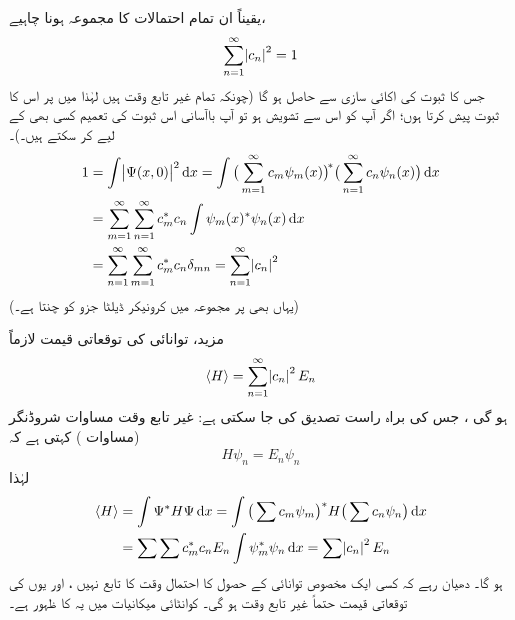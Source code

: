 یقیناً ان تمام احتمالات کا مجموعہ  ہونا  چاہیے،
\begin{align}
\sum_{n=1}^{\infty}\abs{c_n}^2=1
\end{align}
جس کا ثبوت  کی اکائی سازی سے حاصل ہو گا (چونکہ تمام  غیر تابع وقت ہیں لہٰذا میں  پر اس کا ثبوت پیش کرتا ہوں؛ اگر آپ کو اس سے تشویش ہو تو آپ باآسانی اس ثبوت کی تعمیم کسی بھی  کے لیے کر سکتے ہیں۔)۔
\begin{align*}
1&=\int\abs{\Psi(x,0)}^2\dif x=\int \big(\sum_{m=1}^{\infty}c_m\psi_m(x)\big)^{\!*}\big(\sum_{n=1}^{\infty}c_n\psi_n(x)\big)\dif x\\
&=\sum_{m=1}^{\infty}\sum_{n=1}^{\infty}c_m^*c_n\int\psi_m(x)^*\psi_n(x)\dif x\\
&=\sum_{n=1}^{\infty}\sum_{m=1}^{\infty}c_m^*c_n\delta_{mn}=\sum_{n=1}^{\infty}\abs{c_n}^2
\end{align*}
(یہاں بھی  پر مجموعہ میں کرونیکر ڈیلٹا جزو  کو چنتا ہے۔)

مزید،  توانائی کی توقعاتی قیمت لازماً 
\begin{align}\label{مساوات_غیر_تابع_وقت_توانائی_توقعاتی_قیمت}
\langle H\rangle=\sum_{n=1}^{\infty} \abs{c_n}^2 E_n
\end{align} 
ہو گی ، جس کی  براہ راست  تصدیق کی جا سکتی ہے: غیر تابع وقت مساوات شروڈنگر (مساوات )  کہتی ہے کہ
\begin{align}
H\psi_n=E_n\psi_n
\end{align}
لہٰذا
\begin{align*}
\langle H \rangle &=\int \Psi^*H\Psi\dif x=\int \big(\sum c_m\psi_m\big)^* H\big(\sum c_n\psi_n\big)\dif x\\
&=\sum\sum c_m^*c_nE_n\int \psi_m^*\psi_n\dif x=\sum\abs{c_n}^2 E_n
\end{align*}
ہو گا۔ دھیان رہے کہ کسی ایک مخصوص توانائی کے حصول کا احتمال  وقت کا تابع نہیں  ، اور یوں  کی توقعاتی قیمت حتماً غیر تابع وقت ہو گی۔ کوانٹائی میکانیات میں یہ  کا ظہور ہے۔

